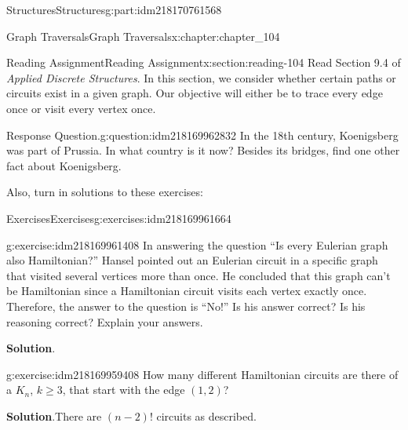 \documentclass[oneside,10pt,]{book}
\newcommand{\blocktitlefont}{\relax}
\numberwithin{equation}{section}
\begin{document}
\begin{partptx}{Structures}{}{Structures}{}{}{g:part:idm218170761568}
%
\begin{chapterptx}{Graph Traversals}{}{Graph Traversals}{}{}{x:chapter:chapter_104}
\index{}%
%
%
\typeout{************************************************}
\typeout{************************************************}
%
\begin{sectionptx}{Reading Assignment}{}{Reading Assignment}{}{}{x:section:reading-104}
Read Section 9.4 of \emph{Applied Discrete Structures}.  In this section, we consider whether certain paths or circuits exist in a given graph.  Our objective will either be to trace every edge once or visit every vertex once.%
\begin{question}{Response Question.}{g:question:idm218169962832}%
In the 18th century, Koenigsberg was  part of Prussia. In what country is it now? Besides its bridges, find one other fact about Koenigsberg.%
\end{question}
Also, turn in solutions to these exercises:%
%
%
\typeout{************************************************}
\typeout{************************************************}
%
\begin{exercises-subsection-numberless}{Exercises}{}{Exercises}{}{}{g:exercises:idm218169961664}
\par\medskip\noindent%
%
\begin{exercisegroup}
\begin{divisionexerciseeg}{1}{}{}{g:exercise:idm218169961408}%
In answering the question ``Is every Eulerian graph also Hamiltonian?'' Hansel pointed out an Eulerian circuit in a specific graph that visited several vertices more than once.  He concluded that this graph can't be Hamiltonian since a Hamiltonian circuit visits each vertex exactly once. Therefore, the answer to the question is ``No!'' Is his answer correct? Is his reasoning correct?  Explain your answers.%
\par\smallskip%
\noindent\textbf{\blocktitlefont Solution}.\hypertarget{g:solution:idm218169959744}{}\quad{}%
\end{divisionexerciseeg}%
\begin{divisionexerciseeg}{2}{}{}{g:exercise:idm218169959408}%
How many different Hamiltonian circuits are there of a \(K_n\), \(k \geq 3\), that start with the edge \((1,2)\)?%
\par\smallskip%
\noindent\textbf{\blocktitlefont Solution}.\hypertarget{g:solution:idm218169957456}{}\quad{}There are \((n-2)!\) circuits as described.%
\end{divisionexerciseeg}%

\end{exercisegroup}
\end{exercises-subsection-numberless}
\end{sectionptx}
\end{chapterptx}
\end{partptx}
\end{document}
